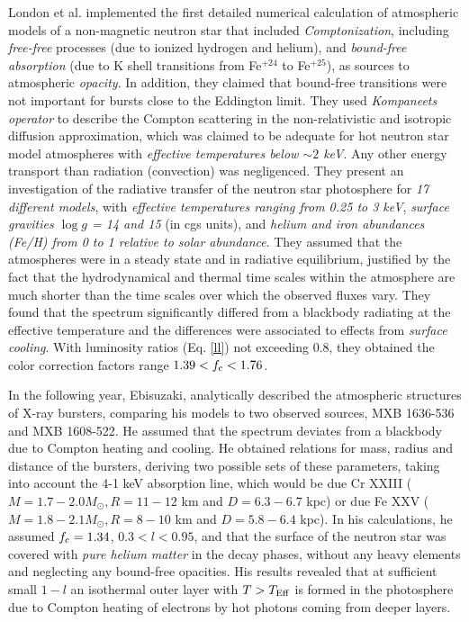 {\quad

London et al. \cite{LON86}  implemented the first detailed numerical calculation of atmospheric models  of a non-magnetic neutron star that included {\it Comptonization}, including {\it free-free} processes (due to ionized hydrogen and helium), and {\it bound-free absorption } (due to K shell transitions from Fe$^{+24}$ to Fe$^{+25}$), as sources to atmospheric {\it opacity}. In addition, they claimed that bound-free transitions were not important for bursts close to the Eddington limit.  They used {\it Kompaneets operator} to describe the Compton scattering in the non-relativistic and isotropic diffusion approximation, which was claimed to be adequate for hot neutron star model atmospheres with {\it effective temperatures below $\sim 2$ keV}.  Any other energy transport than radiation (\eg convection) was negligenced. They present an investigation of the radiative transfer of the neutron star photosphere for {\it 17  different models}, with {\it effective temperatures ranging from 0.25 to 3 keV}, {\it surface gravities $\log g$  = 14 and 15} (in cgs units),  and {\it helium and iron abundances (Fe/H) from 0 to 1 relative to solar abundance}. They assumed that the atmospheres were in a steady state and in radiative equilibrium, justified by the fact that the hydrodynamical and thermal time scales within the atmosphere are much shorter than the time scales over which the observed fluxes vary. They found that the spectrum significantly differed from a blackbody radiating at the effective temperature and the differences were associated to effects from {\it surface cooling}. With luminosity ratios (Eq. \ref{ll}) not exceeding 0.8, they obtained the color correction factors range {\it  $1.39 < f_{\rm c} < 1.76$}.


\quad 

In the following year, Ebisuzaki, \cite{EBI87} analytically described  the atmospheric structures of X-ray bursters, comparing his models to two observed sources, MXB 1636-536 and MXB 1608-522. He assumed that the spectrum deviates from a blackbody  due to Compton heating and cooling. He obtained relations for mass, radius and distance of the bursters, deriving two possible sets of these  parameters, taking into account the 4-1 keV absorption line, which would be due Cr {\rm \tiny XXIII} ($M=1.7-2.0 M_{\odot}, R = 11-12$ km and $D=6.3-6.7$ kpc) or due Fe {\rm \tiny XXV} ($M=1.8-2.1M_{\odot}, R=8-10$ km and $D=5.8-6.4$ kpc). In his calculations, he assumed $f_{\rm c} = 1.34$, $0.3 < l < 0.95$, and that the surface of the neutron star was covered with {\it pure helium matter} in the decay phases, without any heavy elements and neglecting any bound-free opacities.  His results revealed that at sufficient small $1-l$ an isothermal outer layer with $T>T_{\rm Eff}$ is formed in the photosphere due to Compton heating of electrons by hot photons coming from deeper layers.

}
